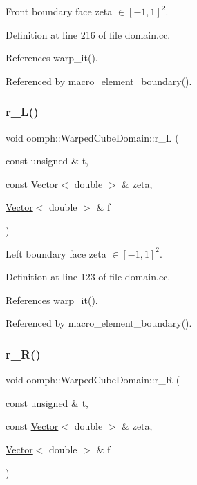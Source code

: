Front boundary face zeta $ \in [-1,1]^2 $. 



Definition at line 216 of file domain.\+cc.



References warp\+\_\+it().



Referenced by macro\+\_\+element\+\_\+boundary().

\mbox{\label{classoomph_1_1WarpedCubeDomain_a8b2734f9c86307ed64077bd2fb653e10}} 
\subsubsection{\texorpdfstring{r\+\_\+\+L()}{r\_L()}}
{\footnotesize\ttfamily void oomph\+::\+Warped\+Cube\+Domain\+::r\+\_\+L (\begin{DoxyParamCaption}\item[{const unsigned \&}]{t,  }\item[{const \hyperlink{classoomph_1_1Vector}{Vector}$<$ double $>$ \&}]{zeta,  }\item[{\hyperlink{classoomph_1_1Vector}{Vector}$<$ double $>$ \&}]{f }\end{DoxyParamCaption})\hspace{0.3cm}{\ttfamily [private]}}



Left boundary face zeta $ \in [-1,1]^2 $. 



Definition at line 123 of file domain.\+cc.



References warp\+\_\+it().



Referenced by macro\+\_\+element\+\_\+boundary().

\mbox{\label{classoomph_1_1WarpedCubeDomain_a42c199ecf6819cbfe5e07bdd65954b69}} 
\subsubsection{\texorpdfstring{r\+\_\+\+R()}{r\_R()}}
{\footnotesize\ttfamily void oomph\+::\+Warped\+Cube\+Domain\+::r\+\_\+R (\begin{DoxyParamCaption}\item[{const unsigned \&}]{t,  }\item[{const \hyperlink{classoomph_1_1Vector}{Vector}$<$ double $>$ \&}]{zeta,  }\item[{\hyperlink{classoomph_1_1Vector}{Vector}$<$ double $>$ \&}]{f }\end{DoxyParamCaption})\hspace{0.3cm}{\ttfamily [private]}}



